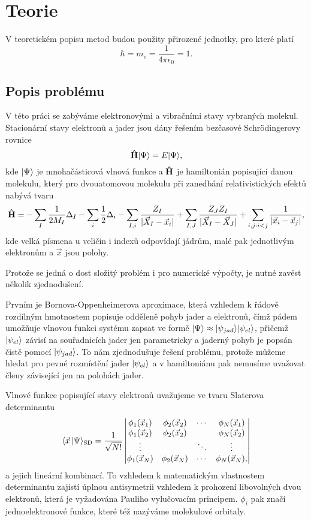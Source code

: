 \chapter{Teorie}
V teoretickém popisu metod budou použity přirozené jednotky, pro které platí
$$ \hbar = m_e = \frac{1}{4\pi\epsilon_0} = 1. $$
\section{Popis problému}
\label{approx}
V této práci se zabýváme elektronovými a vibračními stavy vybraných molekul. Stacionární stavy elektronů a jader jsou dány řešením
bezčasové Schrödingerovy rovnice
\begin{equation}
\mathbf{\hat{H}}| \Psi \rangle = E| \Psi \rangle,
\end{equation}
kde $| \Psi \rangle$ je mnohačásticová vlnová funkce a $\mathbf{\hat{H}}$ je hamiltonián popisující 
danou molekulu, který pro dvouatomovou molekulu při zanedbání relativistických efektů
nabývá tvaru
\begin{equation}
\mathbf{\hat{H}} =-\sum_{I}\frac{1}{2M_I}\Delta_I 
-\sum_{i}\frac{1}{2}\Delta_i
 -\sum_{I,i} \frac{Z_{I}}{|\vec{X}_I - \vec{x}_i|}
 +\sum_{I,J} \frac{Z_{J}Z_{I}}{|\vec{X}_I - \vec{X}_J|} 
 +\sum_{i,j:i<j} \frac{1}{|\vec{x}_i - \vec{x}_j|},
\end{equation}
kde velká písmena u veličin i indexů odpovídají jádrům, malé pak jednotlivým 
elektronům a $\vec{x}$ jsou polohy.

Protože se jedná o dost složitý problém i pro numerické výpočty, je nutné zavést 
několik zjednodušení. 

Prvním je Bornova-Oppenheimerova aproximace, která vzhledem k řádově 
rozdílným hmotnostem popisuje odděleně pohyb jader a elektronů, čímž 
pádem umožňuje vlnovou funkci systému zapsat ve formě $| \Psi \rangle \approx 
| \psi_{jad} \rangle| \psi_{el} \rangle$, přičemž $| \psi_{el} \rangle$ závisí na souřadnicích 
jader jen parametricky a jaderný pohyb je popsán čistě pomocí $| \psi_{jad} \rangle$.
To nám zjednodušuje řešení problému, protože můžeme hledat pro pevné rozmístění jader 
$| \psi_{el} \rangle$ a v hamiltoniánu pak nemusíme uvažovat členy závisející jen na 
polohách jader.

Vlnové funkce popisující stavy elektronů uvažujeme ve tvaru Slaterova determinantu
\begin{equation}
\langle \vec{x}\, | \Psi \rangle_{\mathrm{SD}} = \frac{1}{\sqrt{N!}}\begin{vmatrix}
\phi_1(\vec{x}_1) & \phi_2(\vec{x}_2)& \cdots & \phi_N(\vec{x}_1) \\
\phi_1(\vec{x}_2) & \phi_2(\vec{x}_2)&        & \phi_N(\vec{x}_2)\\
\vdots         &               & \ddots & \vdots \\
\phi_1(\vec{x}_N) & \phi_2(\vec{x}_N)& \cdots & \phi_N(\vec{x}_N),
\end{vmatrix}
\end{equation}
a jejich lineární kombinací. To vzhledem k matematickým vlastnostem determinantu zajistí úplnou antisymetrii  vzhledem k prohození libovolných dvou elektronů, která je vyžadována Pauliho vylučovacím principem. $\phi_i$ pak značí jednoelektronové funkce, které též nazýváme molekulové orbitaly.

